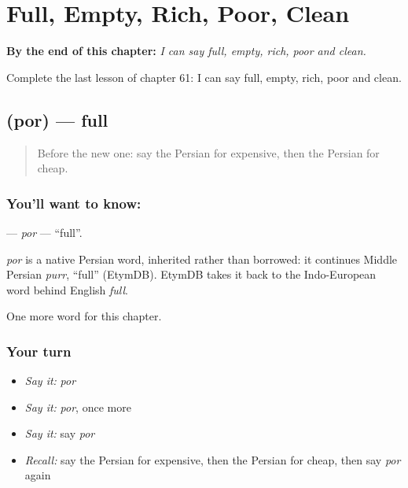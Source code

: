 
\chapter{Full, Empty, Rich, Poor, Clean}
\label{ch:fa-full-empty-rich-poor-clean}

\begin{chapteropening}
\textbf{By the end of this chapter:} \emph{I can say full, empty, rich, poor and clean.}

Complete the last lesson of chapter 61: I can say full, empty, rich, poor and clean.
\end{chapteropening}

\section[\texorpdfstring{\fa{پر} (por)}{پر (por)}]{ (por) — full}

\label{lesson:FA-C61-por}



\begin{quote}
Before the new one: say the Persian for expensive, then the Persian for cheap.
\end{quote}

\subsection*{You'll want to know: }
\textbf{} — \emph{por} — \textquotedblleft{}full\textquotedblright{}.

\begin{cousinweb}
\emph{por} is a native Persian word, inherited rather than borrowed: it continues Middle Persian \emph{purr}, \textquotedblleft{}full\textquotedblright{} (EtymDB). EtymDB takes it back to the Indo-European word behind English \emph{full}.
\end{cousinweb}

\begin{grammarlens}[title={What you've built}]
One more word for this chapter.
\end{grammarlens}

\subsection*{Your turn}
\begin{itemize}
\raggedright
  \item \emph{Say it:} \emph{por}
  \item \emph{Say it:} \emph{por}, once more
  \item \emph{Say it:} say \emph{por}
  \item \emph{Recall:} say the Persian for expensive, then the Persian for cheap, then say \emph{por} again
\end{itemize}

